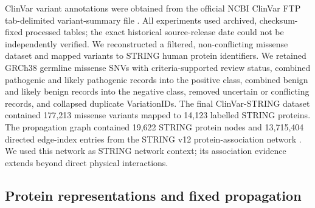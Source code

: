 \documentclass[conference]{IEEEtran}
\begin{document}
ClinVar variant annotations were obtained from the official NCBI ClinVar FTP tab-delimited variant-summary file \cite{Landrum2020ClinVar}. All experiments used archived, checksum-fixed processed tables; the exact historical source-release date could not be independently verified. We reconstructed a filtered, non-conflicting missense dataset and mapped variants to STRING human protein identifiers. We retained GRCh38 germline missense SNVs with criteria-supported review status, combined pathogenic and likely pathogenic records into the positive class, combined benign and likely benign records into the negative class, removed uncertain or conflicting records, and collapsed duplicate VariationIDs. The final ClinVar-STRING dataset contained 177,213 missense variants mapped to 14,123 labelled STRING proteins. The propagation graph contained 19,622 STRING protein nodes and 13,715,404 directed edge-index entries from the STRING v12 protein-association network \cite{Szklarczyk2023STRING}. We used this network as STRING network context; its association evidence extends beyond direct physical interactions.

\subsection{Protein representations and fixed propagation}
\end{document}

